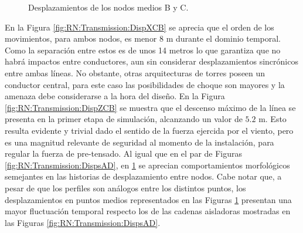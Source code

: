 \begingroup
\centering
\begin{figure}[htbp]
	\centering
	\caption{Desplazamientos de los nodos medios B y C. \label{fig:RN:Transmission:DispsCB}}
\end{figure}
\endgroup

En la Figura \ref{fig:RN:Transmission:DispXCB} se aprecia que el orden de los movimientos, para ambos nodos, es menor $8$ m durante el dominio temporal. Como la separación entre estos es de unos 14 metros lo que garantiza que no habrá impactos entre conductores, aun sin considerar desplazamientos sincrónicos entre ambas líneas. No obstante, otras arquitecturas de torres poseen un conductor central, para este caso las posibilidades de choque son mayores y la amenaza debe considerarse a la hora del diseño. En la Figura \ref{fig:RN:Transmission:DispZCB} se muestra que el descenso máximo de la línea se presenta en la primer etapa de simulación, alcanzando un valor de $5.2$ m. Esto resulta evidente y trivial dado el sentido de la fuerza ejercida por el viento, pero es una magnitud relevante de seguridad al momento de la instalación, para regular la fuerza de pre-tensado. Al igual que en el par de Figuras \ref{fig:RN:Transmission:DispsAD}, en \ref{fig:RN:Transmission:DispsCB} se aprecian comportamientos morfológicos semejantes en las historias de desplazamiento entre nodos. Cabe notar que, a pesar de que los perfiles son análogos entre los distintos puntos, los desplazamientos en puntos medios representados en las Figuras \ref{fig:RN:Transmission:DispsCB} presentan una mayor fluctuación temporal respecto los de las cadenas aisladoras mostradas en las Figuras \ref{fig:RN:Transmission:DispsAD}.

